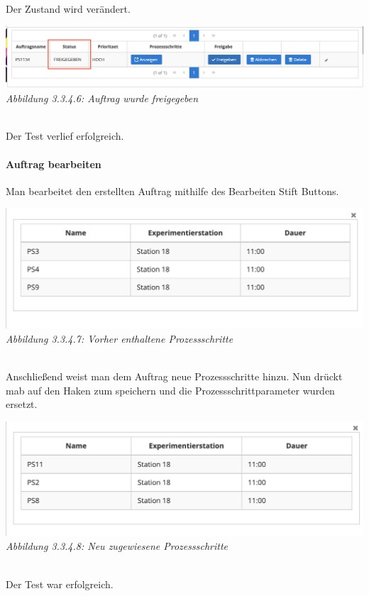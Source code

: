 \documentclass[enabledeprecatedfontcommands,fontsize=12pt,paper=a4,twoside]{scrartcl}
\begin{document}
Der Zustand wird verändert. 

\hypertarget{sc3.3.4.6}{
\includegraphics[width=1\textwidth]{Screenshots/3346.png}
\textit{Abbildung 3.3.4.6: Auftrag wurde freigegeben}
} \\

Der Test verlief erfolgreich.

%
\paragraph{Auftrag bearbeiten}

Man bearbeitet den erstellten Auftrag mithilfe des Bearbeiten Stift Buttons.

\hypertarget{sc3.3.4.7}{
\includegraphics[width=1\textwidth]{Screenshots/3347.png}
\textit{Abbildung 3.3.4.7: Vorher enthaltene Prozessschritte}
} \\

Anschließend weist man dem Auftrag neue Prozessschritte hinzu. Nun drückt mab auf den Haken zum speichern und die Prozessschrittparameter wurden ersetzt. 

\hypertarget{sc3.3.4.8}{
\includegraphics[width=1\textwidth]{Screenshots/3348.png}
\textit{Abbildung 3.3.4.8: Neu zugewiesene Prozessschritte}
} \\

Der Test war erfolgreich.
\end{document}
